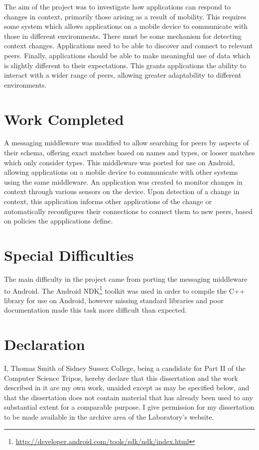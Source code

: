 \documentclass[12pt,twoside,notitlepage]{report}
\begin{document}
The aim of the project was to investigate how applications can respond to changes in context, primarily those arising as a result of mobility. 
This requires some system which allows applications on a mobile device to communicate with those in different environments. 
There must be some mechanism for detecting context changes. 
Applications need to be able to discover and connect to relevant peers. 
Finally, applications should be able to make meaningful use of data which is slightly different to their expectations. 
This grants applications the ability to interact with a wider range of peers, allowing greater adaptability to different environments.

\section*{Work Completed}

A messaging middleware was modified to allow searching for peers by aspects of their schema, offering exact matches based on names and types, or looser matches which only consider types.
This middleware was ported for use on Android, allowing applications on a mobile device to communicate with other systems using the same middleware. 
An application was created to monitor changes in context through various sensors on the device. 
Upon detection of a change in context, this application informs other applications of the change or automatically reconfigures their connections to connect them to new peers, based on policies the appplications define.

\section*{Special Difficulties}

The main difficulty in the project came from porting the messaging middleware to Android. The Android NDK\footnote{\url{http://developer.android.com/tools/sdk/ndk/index.html}} toolkit was used in order to compile the C++ library for use on Android, however missing standard libraries and poor documentation made this task more difficult than expected.
 
\section*{Declaration}

I, Thomas Smith of Sidney Sussex College, being a candidate for Part II of the Computer
Science Tripos, hereby declare that this dissertation and the work described in it are my own work,
unaided except as may be specified below, and that the dissertation
does not contain material that has already been used to any substantial
extent for a comparable purpose. 
I give permission for my dissertation to be made available in the archive area of the Laboratory's website.
\end{document}

